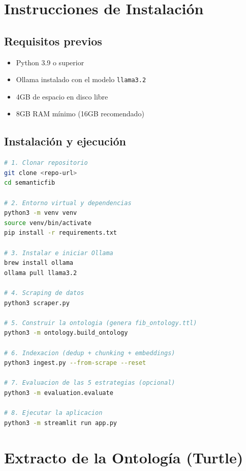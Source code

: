 \documentclass[12pt, a4paper, twoside]{report}
\begin{document}
\begin{appendices}

\chapter{Instrucciones de Instalaci\'on}
\label{app:instalacion}

\section{Requisitos previos}

\begin{itemize}
  \item Python 3.9 o superior
  \item Ollama instalado con el modelo \texttt{llama3.2}
  \item 4GB de espacio en disco libre
  \item 8GB RAM m\'inimo (16GB recomendado)
\end{itemize}

\section{Instalaci\'on y ejecuci\'on}

\begin{lstlisting}[language=bash, caption={Comandos de instalaci\'on y ejecuci\'on}]
# 1. Clonar repositorio
git clone <repo-url>
cd semanticfib

# 2. Entorno virtual y dependencias
python3 -m venv venv
source venv/bin/activate
pip install -r requirements.txt

# 3. Instalar e iniciar Ollama
brew install ollama
ollama pull llama3.2

# 4. Scraping de datos
python3 scraper.py

# 5. Construir la ontologia (genera fib_ontology.ttl)
python3 -m ontology.build_ontology

# 6. Indexacion (dedup + chunking + embeddings)
python3 ingest.py --from-scrape --reset

# 7. Evaluacion de las 5 estrategias (opcional)
python3 -m evaluation.evaluate

# 8. Ejecutar la aplicacion
python3 -m streamlit run app.py
\end{lstlisting}

\chapter{Extracto de la Ontolog\'ia (Turtle)}
\label{app:ttl}


\end{appendices}
\end{document}
